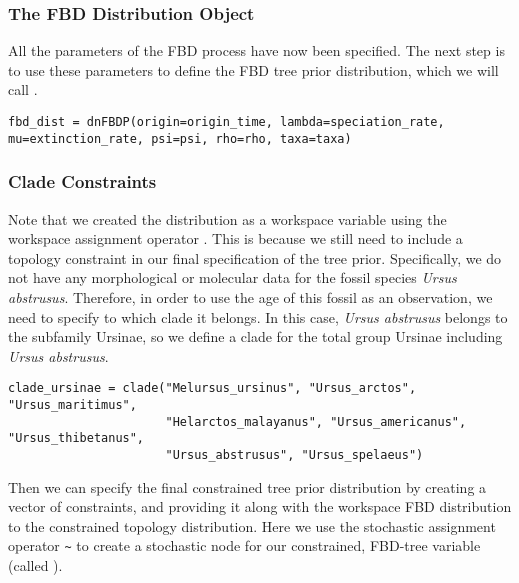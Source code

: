 \subsubsection{The FBD Distribution Object}\label{subsub:Exercise-FBD-dnFBD}

All the parameters of the FBD process have now been specified. 
The next step is to use these parameters to define the FBD tree prior distribution, which we will call .

{\tt \begin{snugshade*}
\begin{lstlisting}
fbd_dist = dnFBDP(origin=origin_time, lambda=speciation_rate, mu=extinction_rate, psi=psi, rho=rho, taxa=taxa)
\end{lstlisting}
\end{snugshade*}}

\subsubsection{Clade Constraints}\label{subsub:Exercise-FBD-Constraints}

Note that we created the distribution as a workspace variable using the workspace assignment operator \cl{=}.
This is because we still need to include a topology constraint in our final specification of the tree prior.
Specifically, we do not have any morphological or molecular data for the fossil species \textit{Ursus abstrusus}.
Therefore, in order to use the age of this fossil as an observation, we need to specify to which clade it belongs.
In this case, \textit{Ursus abstrusus} belongs to the subfamily Ursinae, so we define a clade for the total group Ursinae including \textit{Ursus abstrusus}.

{\tt \begin{snugshade*}
\begin{lstlisting}
clade_ursinae = clade("Melursus_ursinus", "Ursus_arctos", "Ursus_maritimus", 
                      "Helarctos_malayanus", "Ursus_americanus", "Ursus_thibetanus", 
                      "Ursus_abstrusus", "Ursus_spelaeus")
\end{lstlisting}
\end{snugshade*}}

Then we can specify the final constrained tree prior distribution by creating a vector of constraints, and providing it along with the workspace FBD distribution to the constrained topology distribution.
Here we use the stochastic assignment operator \verb+~+ to create a stochastic node for our constrained, FBD-tree variable (called ). 

